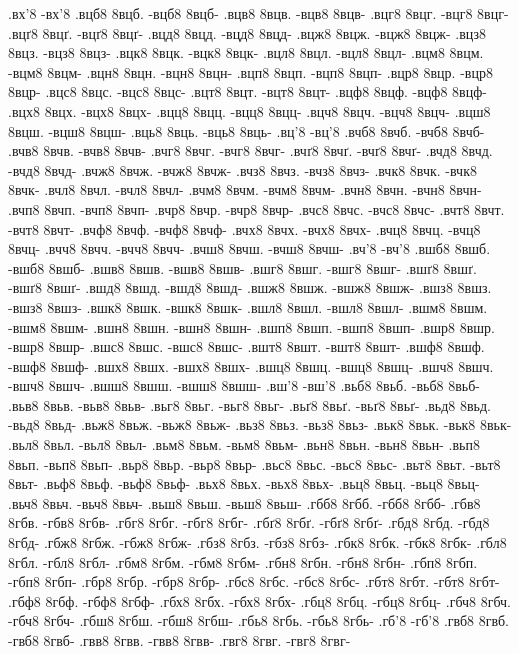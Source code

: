 {.вх'8 -вх'8
.вцб8 8вцб. -вцб8 8вцб-
.вцв8 8вцв. -вцв8 8вцв-
.вцг8 8вцг. -вцг8 8вцг-
.вцґ8 8вцґ. -вцґ8 8вцґ-
.вцд8 8вцд. -вцд8 8вцд-
.вцж8 8вцж. -вцж8 8вцж-
.вцз8 8вцз. -вцз8 8вцз-
.вцк8 8вцк. -вцк8 8вцк-
.вцл8 8вцл. -вцл8 8вцл-
.вцм8 8вцм. -вцм8 8вцм-
.вцн8 8вцн. -вцн8 8вцн-
.вцп8 8вцп. -вцп8 8вцп-
.вцр8 8вцр. -вцр8 8вцр-
.вцс8 8вцс. -вцс8 8вцс-
.вцт8 8вцт. -вцт8 8вцт-
.вцф8 8вцф. -вцф8 8вцф-
.вцх8 8вцх. -вцх8 8вцх-
.вцц8 8вцц. -вцц8 8вцц-
.вцч8 8вцч. -вцч8 8вцч-
.вцш8 8вцш. -вцш8 8вцш-
.вць8 8вць. -вць8 8вць-
.вц'8 -вц'8
.вчб8 8вчб. -вчб8 8вчб-
.вчв8 8вчв. -вчв8 8вчв-
.вчг8 8вчг. -вчг8 8вчг-
.вчґ8 8вчґ. -вчґ8 8вчґ-
.вчд8 8вчд. -вчд8 8вчд-
.вчж8 8вчж. -вчж8 8вчж-
.вчз8 8вчз. -вчз8 8вчз-
.вчк8 8вчк. -вчк8 8вчк-
.вчл8 8вчл. -вчл8 8вчл-
.вчм8 8вчм. -вчм8 8вчм-
.вчн8 8вчн. -вчн8 8вчн-
.вчп8 8вчп. -вчп8 8вчп-
.вчр8 8вчр. -вчр8 8вчр-
.вчс8 8вчс. -вчс8 8вчс-
.вчт8 8вчт. -вчт8 8вчт-
.вчф8 8вчф. -вчф8 8вчф-
.вчх8 8вчх. -вчх8 8вчх-
.вчц8 8вчц. -вчц8 8вчц-
.вчч8 8вчч. -вчч8 8вчч-
.вчш8 8вчш. -вчш8 8вчш-
.вч'8 -вч'8
.вшб8 8вшб. -вшб8 8вшб-
.вшв8 8вшв. -вшв8 8вшв-
.вшг8 8вшг. -вшг8 8вшг-
.вшґ8 8вшґ. -вшґ8 8вшґ-
.вшд8 8вшд. -вшд8 8вшд-
.вшж8 8вшж. -вшж8 8вшж-
.вшз8 8вшз. -вшз8 8вшз-
.вшк8 8вшк. -вшк8 8вшк-
.вшл8 8вшл. -вшл8 8вшл-
.вшм8 8вшм. -вшм8 8вшм-
.вшн8 8вшн. -вшн8 8вшн-
.вшп8 8вшп. -вшп8 8вшп-
.вшр8 8вшр. -вшр8 8вшр-
.вшс8 8вшс. -вшс8 8вшс-
.вшт8 8вшт. -вшт8 8вшт-
.вшф8 8вшф. -вшф8 8вшф-
.вшх8 8вшх. -вшх8 8вшх-
.вшц8 8вшц. -вшц8 8вшц-
.вшч8 8вшч. -вшч8 8вшч-
.вшш8 8вшш. -вшш8 8вшш-
.вш'8 -вш'8
.вьб8 8вьб. -вьб8 8вьб-
.вьв8 8вьв. -вьв8 8вьв-
.вьг8 8вьг. -вьг8 8вьг-
.вьґ8 8вьґ. -вьґ8 8вьґ-
.вьд8 8вьд. -вьд8 8вьд-
.вьж8 8вьж. -вьж8 8вьж-
.вьз8 8вьз. -вьз8 8вьз-
.вьк8 8вьк. -вьк8 8вьк-
.вьл8 8вьл. -вьл8 8вьл-
.вьм8 8вьм. -вьм8 8вьм-
.вьн8 8вьн. -вьн8 8вьн-
.вьп8 8вьп. -вьп8 8вьп-
.вьр8 8вьр. -вьр8 8вьр-
.вьс8 8вьс. -вьс8 8вьс-
.вьт8 8вьт. -вьт8 8вьт-
.вьф8 8вьф. -вьф8 8вьф-
.вьх8 8вьх. -вьх8 8вьх-
.вьц8 8вьц. -вьц8 8вьц-
.вьч8 8вьч. -вьч8 8вьч-
.вьш8 8вьш. -вьш8 8вьш-
.гбб8 8гбб. -гбб8 8гбб-
.гбв8 8гбв. -гбв8 8гбв-
.гбг8 8гбг. -гбг8 8гбг-
.гбґ8 8гбґ. -гбґ8 8гбґ-
.гбд8 8гбд. -гбд8 8гбд-
.гбж8 8гбж. -гбж8 8гбж-
.гбз8 8гбз. -гбз8 8гбз-
.гбк8 8гбк. -гбк8 8гбк-
.гбл8 8гбл. -гбл8 8гбл-
.гбм8 8гбм. -гбм8 8гбм-
.гбн8 8гбн. -гбн8 8гбн-
.гбп8 8гбп. -гбп8 8гбп-
.гбр8 8гбр. -гбр8 8гбр-
.гбс8 8гбс. -гбс8 8гбс-
.гбт8 8гбт. -гбт8 8гбт-
.гбф8 8гбф. -гбф8 8гбф-
.гбх8 8гбх. -гбх8 8гбх-
.гбц8 8гбц. -гбц8 8гбц-
.гбч8 8гбч. -гбч8 8гбч-
.гбш8 8гбш. -гбш8 8гбш-
.гбь8 8гбь. -гбь8 8гбь-
.гб'8 -гб'8
.гвб8 8гвб. -гвб8 8гвб-
.гвв8 8гвв. -гвв8 8гвв-
.гвг8 8гвг. -гвг8 8гвг-
}
